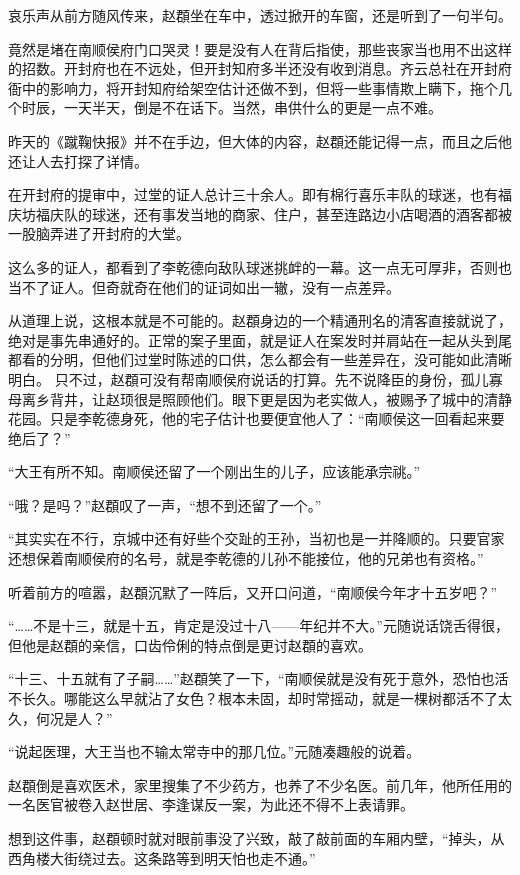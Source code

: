 哀乐声从前方随风传来，赵頵坐在车中，透过掀开的车窗，还是听到了一句半句。

竟然是堵在南顺侯府门口哭灵！要是没有人在背后指使，那些丧家当也用不出这样的招数。开封府也在不远处，但开封知府多半还没有收到消息。齐云总社在开封府衙中的影响力，将开封知府给架空估计还做不到，但将一些事情欺上瞒下，拖个几个时辰，一天半天，倒是不在话下。当然，串供什么的更是一点不难。

昨天的《蹴鞠快报》并不在手边，但大体的内容，赵頵还能记得一点，而且之后他还让人去打探了详情。

在开封府的提审中，过堂的证人总计三十余人。即有棉行喜乐丰队的球迷，也有福庆坊福庆队的球迷，还有事发当地的商家、住户，甚至连路边小店喝酒的酒客都被一股脑弄进了开封府的大堂。

这么多的证人，都看到了李乾德向敌队球迷挑衅的一幕。这一点无可厚非，否则也当不了证人。但奇就奇在他们的证词如出一辙，没有一点差异。

从道理上说，这根本就是不可能的。赵頵身边的一个精通刑名的清客直接就说了，绝对是事先串通好的。正常的案子里面，就是证人在案发时并肩站在一起从头到尾都看的分明，但他们过堂时陈述的口供，怎么都会有一些差异在，没可能如此清晰明白。
只不过，赵頵可没有帮南顺侯府说话的打算。先不说降臣的身份，孤儿寡母离乡背井，让赵顼很是照顾他们。眼下更是因为老实做人，被赐予了城中的清静花园。只是李乾德身死，他的宅子估计也要便宜他人了：“南顺侯这一回看起来要绝后了？”

“大王有所不知。南顺侯还留了一个刚出生的儿子，应该能承宗祧。”

“哦？是吗？”赵頵叹了一声，“想不到还留了一个。”

“其实实在不行，京城中还有好些个交趾的王孙，当初也是一并降顺的。只要官家还想保着南顺侯府的名号，就是李乾德的儿孙不能接位，他的兄弟也有资格。”

听着前方的喧嚣，赵頵沉默了一阵后，又开口问道，“南顺侯今年才十五岁吧？”

“……不是十三，就是十五，肯定是没过十八——年纪并不大。”元随说话饶舌得很，但他是赵頵的亲信，口齿伶俐的特点倒是更讨赵頵的喜欢。

“十三、十五就有了子嗣……”赵頵笑了一下，“南顺侯就是没有死于意外，恐怕也活不长久。哪能这么早就沾了女色？根本未固，却时常摇动，就是一棵树都活不了太久，何况是人？”

“说起医理，大王当也不输太常寺中的那几位。”元随凑趣般的说着。

赵頵倒是喜欢医术，家里搜集了不少药方，也养了不少名医。前几年，他所任用的一名医官被卷入赵世居、李逢谋反一案，为此还不得不上表请罪。

想到这件事，赵頵顿时就对眼前事没了兴致，敲了敲前面的车厢内壁，“掉头，从西角楼大街绕过去。这条路等到明天怕也走不通。”

